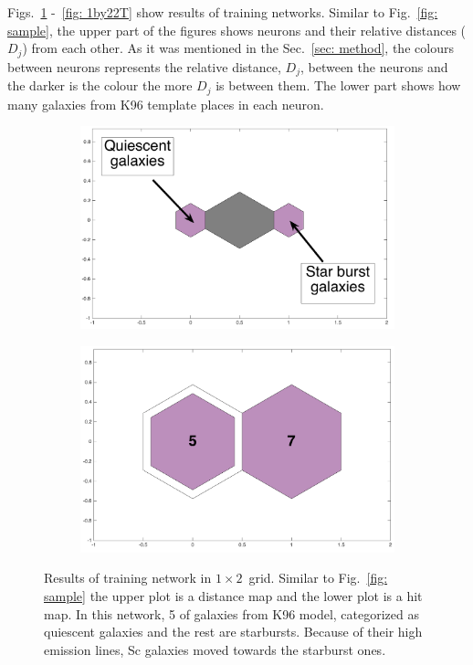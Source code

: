             Figs.~\ref{fig: 1by2T} -~\ref{fig: 1by22T} show results of training networks.
            Similar to Fig.~\ref{fig: sample}, the upper part of the figures shows neurons and their relative distances ($D_j$) from each other.
            As it was mentioned in the Sec.~\ref{sec: method}, the colours between neurons represents the relative distance, $D_j$, between the neurons and the darker is the colour the more $D_j$ is between them. %
            The lower part shows how many galaxies from K96 template places in each neuron. 
            \begin{figure}
                \begin{subfigure}[b]{0.5\textwidth}
                    \centering
                    \includegraphics[width=\textwidth]{../images0.01/1d/dist_1_by_2.png}
                \end{subfigure}
                \hfill
                \begin{subfigure}[b]{0.5\textwidth}
                     \includegraphics[width=\textwidth]{../images0.01/1d/hit_t_1_by_2.png}
                \end{subfigure}
                \caption{Results of training network in $1\times2$~grid. Similar to Fig.~\ref{fig: sample} the upper plot is a distance map and the lower plot is a hit map. In this network, 5 of galaxies from K96 model, categorized as quiescent galaxies and the rest are starbursts. Because of their high emission lines, Sc galaxies moved towards the starburst ones.}
                 \label{fig: 1by2T}
            \end{figure}
